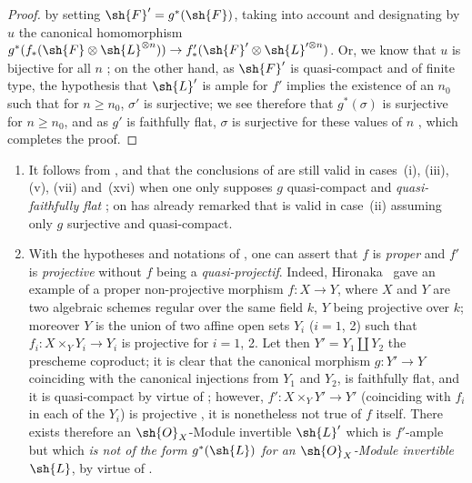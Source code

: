 \begin{proof}
by setting $\sh{F}'=g^*(\sh{F})$, taking into account  and designating by $u$ the
canonical homomorphism $g^*(f_*(\sh{F}\otimes\sh{L}^{\otimes n}))\to f'_*(\sh{F}'\otimes\sh{L}'^{\otimes n})$. Or, we know that $u$ is bijective
for all $n$ ; on the other hand, as $\sh{F}'$ is quasi-compact and of finite type,
the hypothesis that $\sh{L}'$ is ample for $f'$ implies the existence of an $n_0$ such that for $n\geq n_0$,
$\sigma'$ is surjective; we see therefore that $g^*(\sigma)$ is surjective for $n\geq n_0$, and as $g'$ is
faithfully flat, $\sigma$ is surjective for these values of $n$ , which completes the
proof.
\end{proof}


\begin{remarks}[2.7.3]
\label{IV.2.7.3}
\begin{enumerate}[label=(\roman*)]
  \item It follows from ,  and  that the
conclusions of  are still valid in cases~(i), (iii), (v), (vii) and~(xvi)
when one only supposes $g$ quasi-compact and \emph{quasi-faithfully flat} ;
on has already remarked that  is valid in case~(ii) assuming only $g$
surjective and quasi-compact.

  \item With the hypotheses and notations of , one can assert that $f$ is \emph{proper}
and $f'$ is \emph{projective} without $f$ being a \emph{quasi-projectif}. Indeed, Hironaka~\cite{IV-34} gave an example
of a proper non-projective morphism $f:X\to Y$, where $X$ and $Y$ are two algebraic schemes
regular  over the same field $k$, $Y$ being projective over $k$; moreover $Y$ is the union
of two affine open sets $Y_i$ ($i=1$, 2) such that $f_i:X\times_Y Y_i\to Y_i$ is projective for $i=1$, 2.
Let then $Y'=Y_1\amalg Y_2$ the prescheme coproduct; it is clear that the canonical morphism
$g:Y'\to Y$ coinciding with the canonical injections from $Y_1$ and $Y_2$, is faithfully flat,
and it is quasi-compact by virtue of ; however, $f':X\times_Y Y'\to Y'$
(coinciding with $f_i$ in each of the $Y_i$) is projective , it is nonetheless not true of
$f$ itself. There exists therefore an $\sh{O}_X$-Module invertible $\sh{L}'$ which is $f'$-ample but which
\emph{is not of the form $g^*(\sh{L})$ for an $\sh{O}_X$-Module invertible $\sh{L}$}, by virtue of .


\end{enumerate}
\end{remarks}
